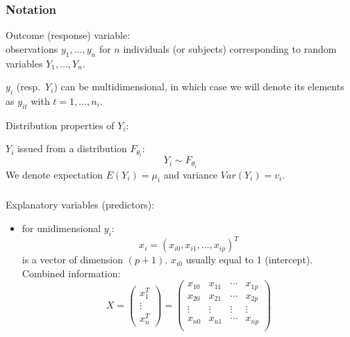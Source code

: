 \documentclass{beamer}
\newcommand{\bs}{\bigskip}
\begin{document}
\begin{frame}
\frametitle{Notation}

{\color{blue}Outcome (response) variable}: \\
observations $y_1, \ldots, y_n$
for $n$ individuals (or subjects) corresponding to random variables $Y_1,
\ldots, Y_n$.

\bs

$y_i$ (resp.\ $Y_i$) can be multidimensional, in which case
we will denote its elements as $y_{it}$ with $t=1,\ldots,n_i$.

\bs

{\color{blue}Distribution properties of $Y_i$}:

$Y_i$ issued from a distribution $F_{\theta_i}$:
$$Y_i \sim F_{\theta_i}$$
We denote expectation $E(Y_i) = \mu_i$ and variance $Var(Y_i) = v_i$.
\end{frame}

\begin{frame}
\frametitle{}

{\color{blue}Explanatory variables (predictors)}:
\begin{itemize}
\item for unidimensional $y_i$:
$$x_i = (x_{i0}, x_{i1}, \ldots, x_{ip})^T$$
is a vector of dimension $(p+1)$. $x_{i0}$ usually equal to 1
(intercept). Combined information:
$$X =  \left( \begin{array}{c}
x_1^T\\
\vdots \\
x_n^T
\end{array} \right) =
\left(
\begin{array}{cccc}
x_{10} & x_{11} & \cdots & x_{1p}\\
x_{20} & x_{21} & \cdots & x_{2p}\\
\vdots & \vdots & \vdots & \vdots \\
x_{n0} & x_{n1} & \cdots & x_{np}\\
\end{array} \right)
$$

\label{Ximatrix}
\end{itemize}
\end{frame}
\end{document}
